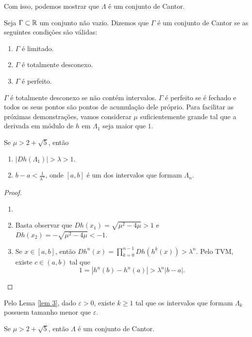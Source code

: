 Com isso, podemos mostrar que $\Lambda$ é um conjunto de Cantor.

\begin{definition}
Seja $\Gamma \subset \mathbb{R}$ um conjunto não vazio. Dizemos que $\Gamma$ é um conjunto de Cantor se as seguintes condições são válidas:
\begin{enumerate}[label=\roman*.]
\item $\Gamma$ é limitado.
\item $\Gamma$ é totalmente desconexo.
\item $\Gamma$ é perfeito.
\end{enumerate}
\end{definition}

$\Gamma$ é totalmente desconexo se não contém intervalos. $\Gamma$ é perfeito se é fechado e todos os seus pontos são pontos de acumulação dele próprio. Para facilitar as próximas demonstrações, vamos considerar $\mu$ suficientemente grande tal que a derivada em módulo de $h$ em $\Lambda_1$ seja maior que $1$.

\begin{lemma}\label{lem 3}
Se $\mu > 2 + \sqrt{5}$, então
\begin{enumerate}
\item  $|D h(\Lambda_1)| > \lambda > 1$.
\item $b - a < \frac{1}{\lambda^n}$, onde $[a, b]$ é um dos intervalos que formam $\Lambda_n$.
\end{enumerate}
\end{lemma}

\begin{proof}
\begin{enumerate}\item[]
\item Basta observar que $D h(x_1) = \sqrt{\mu^2 - 4\mu} > 1$ e $D h(x_2) = -\sqrt{\mu^2 - 4\mu} < -1$.
\item Se $x \in [a, b]$, então $D h^n(x) = \prod_{k=0}^{n-1} D h(h^k(x)) > \lambda^n$. Pelo TVM, existe $c \in (a, b)$ tal que
$$1 = |h^n(b) - h^n(a)| > \lambda^n|b - a|.$$
\end{enumerate}
\end{proof} 

Pelo Lema \ref{lem 3}, dado $\varepsilon > 0$, existe $k \geq 1$ tal que os intervalos que formam $\Lambda_k$ possuem tamanho menor que $\varepsilon$. 

\begin{theorem}\label{teo 3-1}
Se $\mu > 2 + \sqrt{5}$, então $\Lambda$ é um conjunto de Cantor.
\end{theorem}

